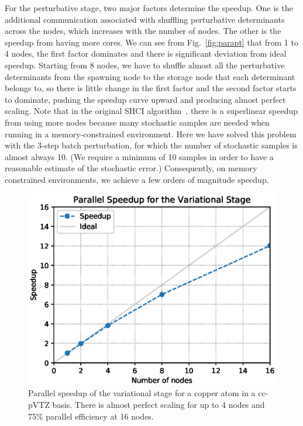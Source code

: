 \documentclass[%
preprint,
 superscriptaddress,
 amsmath,amssymb,
 aps,
]{revtex4-1}
\begin{document}
For the perturbative stage, two major factors determine the speedup.
One is the additional communication associated with
shuffling perturbative determinants across the nodes, which increases with the number of nodes.
The other is the speedup from having more cores.
We can see from Fig.~\ref{fig:parapt} that from 1 to 4 nodes, the first factor dominates and there is significant deviation from ideal speedup.
Starting from 8 nodes, we have to shuffle almost all the perturbative determinants from the spawning node to the storage node that each determinant belongs to,
so there is little change in the first factor and the second factor starts to dominate, pushing the speedup curve upward and producing almost perfect scaling.
Note that in the original SHCI algorithm~\cite{ShaHolJeaAlaUmr-JCTC-17}, there is a superlinear speedup from using more nodes
because many stochastic samples are needed when running in a memory-constrained environment.
Here we have solved this problem with the 3-step batch perturbation, for which the number of stochastic samples
is almost always 10.  (We require a minimum of 10 samples in order to have a reasonable estimate of the stochastic error.)
Consequently, 
on memory constrained environments,
we achieve a few orders of magnitude speedup.

\begin{figure}[h]
  \includegraphics[width=\linewidth]{scalability/var}
  \caption{Parallel speedup of the variational stage for a copper atom in a cc-pVTZ basis.
There is almost perfect scaling for up to 4 nodes and 75\% parallel efficiency at 16 nodes.
}
  \label{fig:paravar}
\end{figure}
 
\end{document}
